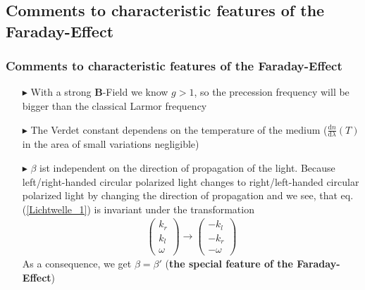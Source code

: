 \documentclass[11pt,a4paper]{beamer}
\begin{document}
\begin{frame}
\subsection{Comments to characteristic features of the Faraday-Effect}
\frametitle{Comments to characteristic features of the Faraday-Effect}
\begin{itemize}
\item[$\blacktriangleright$] With a strong \textbf{B}-Field we know $g > 1$, so the precession frequency will be bigger than the classical Larmor frequency
\item[$\blacktriangleright$] The Verdet constant dependens on the temperature of the medium ($\frac{\text{d} n}{\text{d} \lambda}(T)$ in the area of small variations negligible)
\item[$\blacktriangleright$] $\beta$ ist independent on the direction of propagation of the light.
Because left/right-handed circular polarized light changes to right/left-handed circular polarized light by changing the direction of propagation and
we see, that eq. (\ref{Lichtwelle_1}) is invariant under the transformation 
\begin{align}
\begin{pmatrix}
k_r \\
k_l \\
\omega
\end{pmatrix} \rightarrow 
\begin{pmatrix}
-k_l\\
-k_r\\
-\omega
\end{pmatrix}
\end{align}
As a consequence, we get $\beta = \beta'$ \newline(\textbf{the special feature of the Faraday-Effect})
\end{itemize}
\end{frame}
\end{document}
